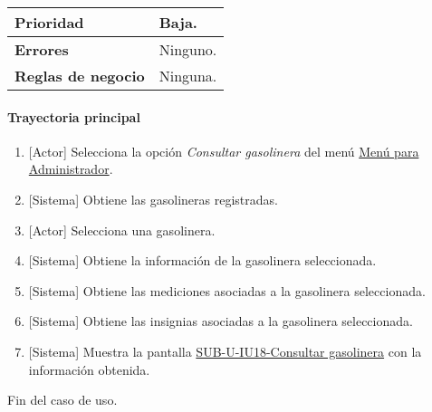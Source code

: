 \begin{longtable}{|J{5cm}|J{10.3cm}|}
		\\ \hline 
	\textbf{Prioridad} & 
		Baja. \\ \hline
	\textbf{Errores} & Ninguno.
		\\ \hline
	\textbf{Reglas de negocio} & Ninguna.
		 \\ \hline
\end{longtable}

\paragraph{Trayectoria principal}
	\begin{enumerate}
		\item {[Actor]} Selecciona la opción \textit{Consultar gasolinera} del menú \hyperref[fig:menu-admi]{Menú para Administrador}.
		\item {[Sistema]} Obtiene las gasolineras registradas.
		\item {[Actor]} Selecciona una gasolinera.
		\item {[Sistema]} Obtiene la información de la gasolinera seleccionada.
		\item {[Sistema]} Obtiene las mediciones asociadas a la gasolinera seleccionada.
		\item {[Sistema]} Obtiene las insignias asociadas a la gasolinera seleccionada.
		\item {[Sistema]} Muestra la pantalla \hyperref[fig:sub-u-iu18]{SUB-U-IU18-Consultar gasolinera} con la información obtenida.
	\end{enumerate}
	Fin del caso de uso.

